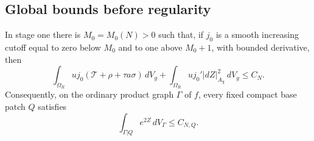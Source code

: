 \subsection{Global bounds before regularity}

\begin{lemma}\label{lem:fc-high-energy}
In stage one there is $M_0=M_0(N)>0$ such that, if $j_0$ is a
smooth increasing cutoff equal to zero below $M_0$ and to one
above $M_0+1$, with bounded derivative, then
\begin{equation}\label{eq:fc-high-energy}
 \int_{\Omega_R}u j_0
       (\mathcal T+\rho+\tau a\sigma)\,dV_g
 +\int_{\Omega_R}u j_0'|dZ|_{A_\chi}^2\,dV_g
 \le C_N.
\end{equation}
Consequently, on the ordinary product graph $\Gamma$ of $f$,
every fixed compact base patch $Q$ satisfies
\begin{equation}\label{eq:fc-graph-L2}
 \int_{\Gamma|Q}e^{2Z}\,dV_\Gamma\le C_{N,Q}.
\end{equation}
\end{lemma}

